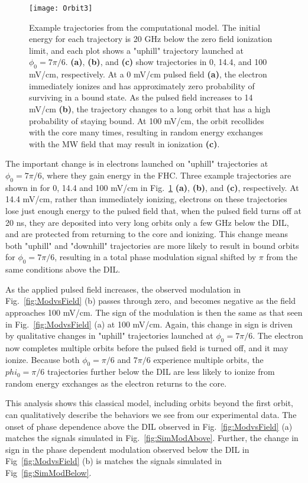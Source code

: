 \documentclass[aps,pra,preprint,groupedaddress]{revtex4-1}
\begin{document}
\begin{figure}
	\texttt{[image: Orbit3]}
	\caption{Example trajectories from the computational model. The initial energy for each trajectory is 20 GHz below the zero field ionization limit, and each plot shows a "uphill" trajectory launched at $\phi_0 = 7\pi/6$. \textbf{(a)}, \textbf{(b)}, and \textbf{(c)} show trajectories in 0, 14.4, and 100 mV/cm, respectively. At a 0 mV/cm pulsed field \textbf{(a)}, the electron immediately ionizes and has approximately zero probability of surviving in a bound state. As the pulsed field increases to 14 mV/cm \textbf{(b)}, the trajectory changes to a long orbit that has a high probability of staying bound. At 100 mV/cm, the orbit recollides with the core many times, resulting in random energy exchanges with the MW field that may result in ionization \textbf{(c)}.}
	\label{fig:Orbit3}
\end{figure}

The important change is in electrons launched on "uphill" trajectories at $\phi_0 = 7\pi/6$, where they gain energy in the FHC. Three example trajectories are shown in for 0, 14.4 and 100 mV/cm in Fig.~\ref{fig:Orbit3} \textbf{(a)}, \textbf{(b)}, and \textbf{(c)}, respectively. At 14.4 mV/cm, rather than immediately ionizing, electrons on these trajectories lose just enough energy to the pulsed field that, when the pulsed field turns off at 20 ns, they are deposited into very long orbits only a few GHz below the DIL, and are protected from returning to the core and ionizing. This change means both "uphill" and "downhill" trajectories are more likely to result in bound orbits for $\phi_0 = 7\pi/6$, resulting in a total phase modulation signal shifted by $\pi$ from the same conditions above the DIL.

As the applied pulsed field increases, the observed modulation in Fig.~\ref{fig:ModvsField} (b) passes through zero, and becomes negative as the field approaches 100 mV/cm. The sign of the modulation is then the same as that seen in Fig.~\ref{fig:ModvsField} (a) at 100 mV/cm. Again, this change in sign is driven by qualitative changes in "uphill" trajectories launched at $\phi_0 = 7\pi/6$. The electron now completes multiple orbits before the pulsed field is turned off, and it may ionize. Because both $\phi_0 = \pi/6$ and $7\pi/6$ experience multiple orbits, the $phi_0 = \pi/6$ trajectories further below the DIL are less likely to ionize from random energy exchanges as the electron returns to the core.

This analysis shows this classical model, including orbits beyond the first orbit, can qualitatively describe the behaviors we see from our experimental data. The onset of phase dependence above the DIL observed in Fig.~\ref{fig:ModvsField} (a) matches the signals simulated in Fig.~\ref{fig:SimModAbove}. Further, the change in sign in the phase dependent modulation observed below the DIL in Fig~\ref{fig:ModvsField} (b) is matches the signals simulated in Fig~\ref{fig:SimModBelow}.
\end{document}
